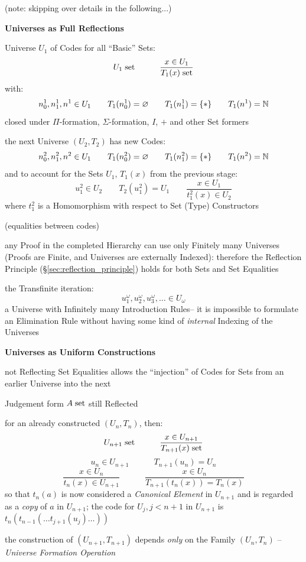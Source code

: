 (note: skipping over details in the following...) %


\textbf{Universes as Full Reflections}

Universe $U_1$ of Codes for all ``Basic'' Sets:
\[
  U_1 \;\mathrm{set} \quad\quad\quad \frac{x \in U_1}{T_1(x) \;\mathrm{set}}
\]
with:
\[
  n_0^1,n_1^1,n^1 \in U_1 \quad\quad T_1(n_0^1) = \varnothing
    \quad\quad T_1(n_1^1) = \{*\} \quad\quad T_1(n^1) = \mathbb{N}
\]
closed under $\Pi$-formation, $\Sigma$-formation, $I$, $+$ and other
Set formers

the next Universe $(U_2,T_2)$ has new Codes:
\[
  n_0^2,n_1^2,n^2 \in U_1 \quad\quad T_1(n_0^2) = \varnothing
    \quad\quad T_1(n_1^2) = \{*\} \quad\quad T_1(n^2) = \mathbb{N}
\]
and to account for the Sets $U_1$, $T_1(x)$ from the previous stage:
\[
  u_1^2 \in U_2 \quad\quad T_2(u^2_1)=U_1 \quad\quad
    \frac{x \in U_1}{t_1^2(x) \in U_2}
\]
where $t_1^2$ is a Homomorphism with respect to Set (Type)
Constructors

(equalities between codes) %

any Proof in the completed Hierarchy can use only Finitely many
Universes (Proofs are Finite, and Universes are externally Indexed):
therefore the Reflection Principle (\S\ref{sec:reflection_principle})
holds for both Sets and Set Equalities

the Transfinite iteration:
\[
  u_1^\omega, u_2^\omega, u_3^\omega, \ldots \in U_\omega
\]
a Universe with Infinitely many Introduction Rules-- it is impossible
to formulate an Elimination Rule without having some kind of
\emph{internal} Indexing of the Universes


\textbf{Universes as Uniform Constructions}

not Reflecting Set Equalities allows the ``injection'' of Codes for
Sets from an earlier Universe into the next

Judgement form $A \;\mathrm{set}$ still Reflected

for an already constructed $(U_n,T_n)$, then:
\[
  U_{n+1} \;\mathrm{set} \quad\quad\quad \frac{x \in U_{n+1}}{T_{n+1}(x) \;\mathrm{set}}
\] \[
  u_n \in U_{n+1} \quad\quad\quad T_{n+1}(u_n) = U_n
\] \[
  \frac{x \in U_n}{t_n(x) \in U_{n+1}} \quad\quad\quad
    \frac{x \in U_n}{T_{n+1}(t_n(x)) = T_n(x)}
\]
so that $t_n(a)$ is now considered a \emph{Canonical Element} in
$U_{n+1}$ and is regarded as a \emph{copy} of $a$ in $U_{n+1}$; the
code for $U_j, j < n+1$ in $U_{n+1}$ is $t_n(t_{n-1}(\ldots
t_{j+1}(u_j) \ldots))$

the construction of $(U_{n+1},T_{n+1})$ depends \emph{only} on the
Family $(U_n,T_n)$ -- \emph{Universe Formation Operation}


